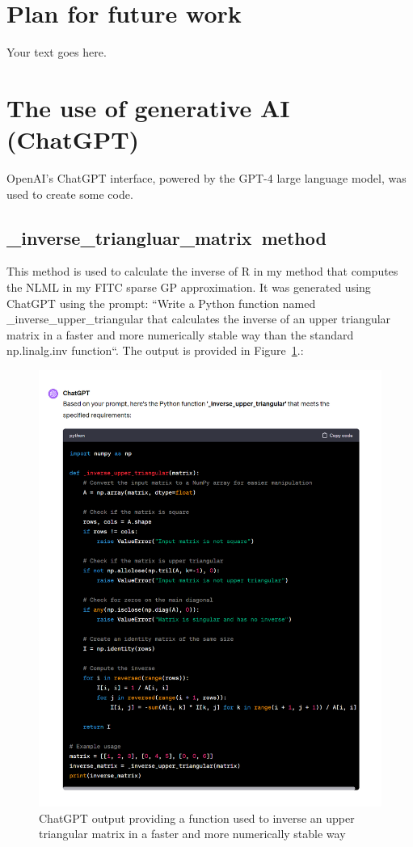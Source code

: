 \documentclass[12pt]{article}
\begin{document}
    \section{Plan for future work}
    Your text goes here.

    \appendix
    \section{The use of generative AI (ChatGPT)}
    OpenAI's ChatGPT interface, powered by the GPT-4 large language model, was used to create some code.
    \subsection{\_inverse\_triangluar\_matrix\ method}
    This method is used to calculate the inverse of R in my method that computes the NLML in my FITC sparse GP approximation.
    It was generated using ChatGPT using the prompt: ``Write a Python function named \_inverse\_upper\_triangular that calculates the inverse of an upper triangular matrix in a faster and more numerically stable way than the standard np.linalg.inv function``.
    The output is provided in Figure~\ref{fig:chat-iut}.:
    \begin{figure}[H]
        \centering
        \includegraphics[width=1.1\linewidth]{figures/chat-iut/chat-iut.png}
        \caption{ChatGPT output providing a function used to inverse an upper triangular matrix in a faster and more numerically stable way}
        \label{fig:chat-iut}
    \end{figure}
\end{document}
